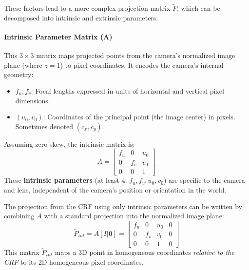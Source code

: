 \documentclass{article}
\begin{document}
These factors lead to a more complex projection matrix $\tilde{P}$, which can be decomposed into intrinsic and extrinsic parameters.

\paragraph{Intrinsic Parameter Matrix (A)}
This $3 \times 3$ matrix maps projected points from the camera's normalized image plane (where $z=1$) to pixel coordinates. It encodes the camera's internal geometry:
\begin{itemize}
    \item $f_u, f_v$: Focal lengths expressed in units of horizontal and vertical pixel dimensions.
    \item $(u_0, v_0)$: Coordinates of the principal point (the image center) in pixels. Sometimes denoted $(c_x, c_y)$.
\end{itemize}
Assuming zero skew, the intrinsic matrix is:
\[
A =
\begin{bmatrix}
  f_u & 0 & u_0 \\
  0 & f_v & v_0 \\
  0 & 0 & 1
\end{bmatrix}
\]
These \textbf{intrinsic parameters} (at least 4: $f_u, f_v, u_0, v_0$) are specific to the camera and lens, independent of the camera's position or orientation in the world.

The projection from the CRF using only intrinsic parameters can be written by combining $A$ with a standard projection into the normalized image plane:
\[
\tilde{P}_{int} = A [I | \mathbf{0}] =
\begin{bmatrix}
  f_u & 0 & u_0 & 0 \\
  0 & f_v & v_0 & 0 \\
  0 & 0 & 1 & 0
\end{bmatrix}
\]
This matrix $\tilde{P}_{int}$ maps a 3D point in homogeneous coordinates \emph{relative to the CRF} to its 2D homogeneous pixel coordinates.

\end{document}
